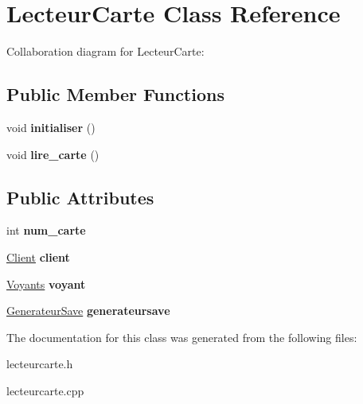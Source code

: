 \hypertarget{classLecteurCarte}{}\section{Lecteur\+Carte Class Reference}
\label{classLecteurCarte}


Collaboration diagram for Lecteur\+Carte\+:
\subsection*{Public Member Functions}
\begin{DoxyCompactItemize}
\item 
\mbox{\label{classLecteurCarte_a723859d389df0d286a553d39ec77a11f}} 
void {\bfseries initialiser} ()
\item 
\mbox{\label{classLecteurCarte_a90e4f75fb492935ebaf5f908173763af}} 
void {\bfseries lire\+\_\+carte} ()
\end{DoxyCompactItemize}
\subsection*{Public Attributes}
\begin{DoxyCompactItemize}
\item 
\mbox{\label{classLecteurCarte_a503cf240c6207763bde7e3363e01a24e}} 
int {\bfseries num\+\_\+carte}
\item 
\mbox{\label{classLecteurCarte_a94b3dd277eca1d1e1d2d4ab6e676c2ad}} 
\hyperlink{classClient}{Client} {\bfseries client}
\item 
\mbox{\label{classLecteurCarte_aa14219cc5dcb3093286e630a21922a01}} 
\hyperlink{classVoyants}{Voyants} {\bfseries voyant}
\item 
\mbox{\label{classLecteurCarte_af9574437ae12548412f7c6d63712f834}} 
\hyperlink{classGenerateurSave}{Generateur\+Save} {\bfseries generateursave}
\end{DoxyCompactItemize}


The documentation for this class was generated from the following files\+:\begin{DoxyCompactItemize}
\item 
lecteurcarte.\+h\item 
lecteurcarte.\+cpp\end{DoxyCompactItemize}
